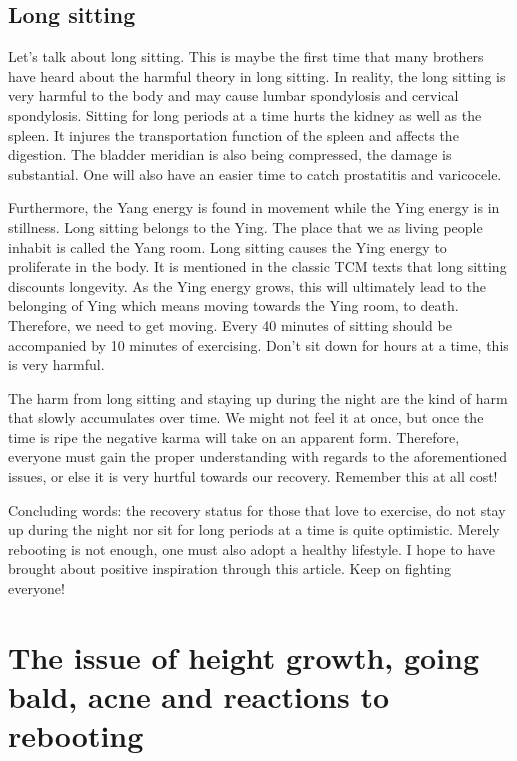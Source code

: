 \documentclass[
]{book}
\begin{document}
\hypertarget{long-sitting}{%
\section{Long sitting}\label{long-sitting}}

Let's talk about long sitting. This is maybe the first time that many brothers have heard about the harmful theory in long sitting. In reality, the long sitting is very harmful to the body and may cause lumbar spondylosis and cervical spondylosis. Sitting for long periods at a time hurts the kidney as well as the spleen. It injures the transportation function of the spleen and affects the digestion. The bladder meridian is also being compressed, the damage is substantial. One will also have an easier time to catch prostatitis and varicocele.

Furthermore, the Yang energy is found in movement while the Ying energy is in stillness. Long sitting belongs to the Ying. The place that we as living people inhabit is called the Yang room. Long sitting causes the Ying energy to proliferate in the body. It is mentioned in the classic TCM texts that long sitting discounts longevity. As the Ying energy grows, this will ultimately lead to the belonging of Ying which means moving towards the Ying room, to death. Therefore, we need to get moving. Every 40 minutes of sitting should be accompanied by 10 minutes of exercising. Don't sit down for hours at a time, this is very harmful.

The harm from long sitting and staying up during the night are the kind of harm that slowly accumulates over time. We might not feel it at once, but once the time is ripe the negative karma will take on an apparent form. Therefore, everyone must gain the proper understanding with regards to the aforementioned issues, or else it is very hurtful towards our recovery. Remember this at all cost!

Concluding words: the recovery status for those that love to exercise, do not stay up during the night nor sit for long periods at a time is quite optimistic. Merely rebooting is not enough, one must also adopt a healthy lifestyle. I hope to have brought about positive inspiration through this article. Keep on fighting everyone!

\hypertarget{the-issue-of-height-growth-going-bald-acne-and-reactions-to-rebooting}{%
\chapter{The issue of height growth, going bald, acne and reactions to rebooting}\label{the-issue-of-height-growth-going-bald-acne-and-reactions-to-rebooting}}
\end{document}
